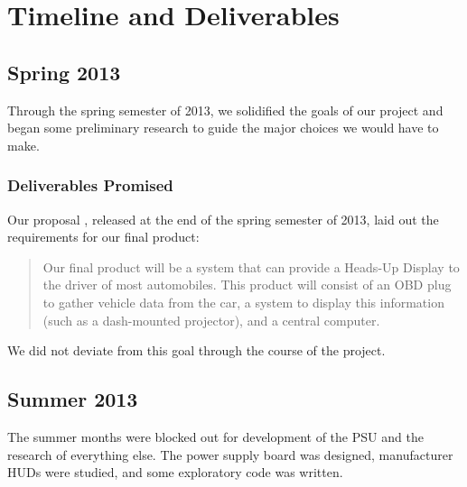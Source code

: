 \chapter{Timeline and Deliverables}


\section{Spring 2013}

Through the spring semester of 2013, we solidified the goals of our project and
began some preliminary research to guide the major choices we would have to
make.

\subsection{Deliverables Promised}

Our proposal \cite{proposal}, released at the end of the spring semester of 2013,
laid out the requirements for our final product:

\begin{quote}
Our final product will be a system that can provide a Heads-Up Display to the
driver of most automobiles. This product will consist of an OBD plug to gather
vehicle data from the car, a system to display this information (such as a
dash-mounted projector), and a central computer.
\end{quote}

We did not deviate from this goal through the course of the project.

\section{Summer 2013}

The summer months were blocked out for development of the PSU and the research
of everything else. The power supply board was designed, manufacturer HUDs were
studied, and some exploratory code was written.

